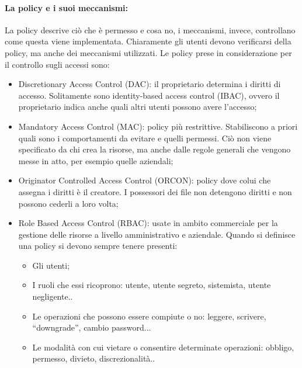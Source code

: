 \paragraph{La policy e i suoi meccanismi: }
La policy descrive ciò che è permesso e cosa no, i meccanismi,
invece, controllano come questa viene implementata. Chiaramente gli utenti devono verificarsi
della policy, ma anche dei meccanismi utilizzati.
Le policy prese in considerazione per il controllo sugli accessi sono:
\begin{itemize}
      \item Discretionary Access Control (DAC): il proprietario determina i
            diritti di accesso. Solitamente sono identity-based access control
            (IBAC), ovvero il proprietario indica anche quali altri utenti
            possono avere l'accesso;
      \item Mandatory Access Control (MAC): policy più restrittive. Stabiliscono
            a priori quali sono i comportamenti da evitare e quelli permessi.
            Ciò non viene specificato da chi crea la risorse, ma anche dalle
            regole generali che vengono messe in atto, per esempio quelle
            aziendali;
      \item Originator Controlled Access Control (ORCON): policy dove colui che
            assegna i diritti è il creatore. I possessori dei file non detengono
            diritti e non possono cederli a loro volta;
      \item Role Based Access Control (RBAC): usate in ambito commerciale per la
            gestione delle risorse a livello amministrativo e aziendale. Quando
            si definisce una policy si devono sempre tenere presenti:
            \begin{itemize}
                  \item Gli utenti;
                  \item I ruoli che essi ricoprono: utente, utente segreto,
                        sistemista, utente negligente..
                  \item Le operazioni che possono essere compiute o no: leggere,
                        scrivere, “downgrade”, cambio password...
                  \item Le modalità con cui vietare o consentire determinate
                        operazioni: obbligo, permesso, divieto,
                        discrezionalità..
            \end{itemize}
\end{itemize}

